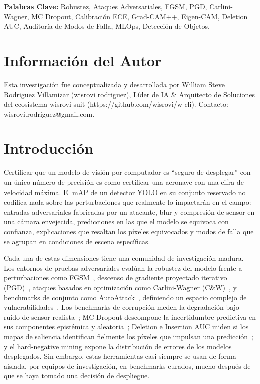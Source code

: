 \documentclass[10pt,twocolumn,letterpaper]{article}
\begin{document}
\textbf{Palabras Clave:} Robustez, Ataques Adversariales, FGSM, PGD, Carlini-Wagner, MC Dropout, Calibración ECE, Grad-CAM++, Eigen-CAM, Deletion AUC, Auditoría de Modos de Falla, MLOps, Detección de Objetos.

\section{Información del Autor}
Esta investigación fue conceptualizada y desarrollada por William Steve Rodriguez Villamizar (wisrovi rodriguez), Líder de IA \& Arquitecto de Soluciones del ecosistema wisrovi-suit (https://github.com/wisrovi/w-cli). Contacto: wisrovi.rodriguez@gmail.com.

\section{Introducción}
Certificar que un modelo de visión por computador es ``seguro de desplegar'' con un único número de precisión es como certificar una aeronave con una cifra de velocidad máxima. El mAP de un detector YOLO en su conjunto reservado no codifica nada sobre las perturbaciones que realmente lo impactarán en el campo: entradas adversariales fabricadas por un atacante, blur y compresión de sensor en una cámara envejecida, predicciones en las que el modelo se equivoca con confianza, explicaciones que resaltan los píxeles equivocados y modos de falla que se agrupan en condiciones de escena específicas.

Cada una de estas dimensiones tiene una comunidad de investigación madura. Los entornos de pruebas adversariales evalúan la robustez del modelo frente a perturbaciones como FGSM~\cite{goodfellow2015fgsm}, descenso de gradiente proyectado iterativo (PGD)~\cite{madry2018towards}, ataques basados en optimización como Carlini-Wagner (C\&W)~\cite{carlini2017towards}, y benchmarks de conjunto como AutoAttack~\cite{croce2020reliable}, definiendo un espacio complejo de vulnerabilidades~\cite{silva2020opportunities}. Los benchmarks de corrupción meden la degradación bajo ruido de sensor realista~\cite{hendrycks2019benchmarking}; MC Dropout descompone la incertidumbre predictiva en sus componentes epistémica y aleatoria~\cite{gal2016dropout,kendall2017uncertainties}; Deletion e Insertion AUC miden si los mapas de saliencia identifican fielmente los píxeles que impulsan una predicción~\cite{petsiuk2018rise,chattopadhay2018gradcam,selvaraju2017grad}; y el hard-negative mining expone la distribución de errores de los modelos desplegados. Sin embargo, estas herramientas casi siempre se usan de forma aislada, por equipos de investigación, en benchmarks curados, mucho después de que se haya tomado una decisión de despliegue.
\end{document}
